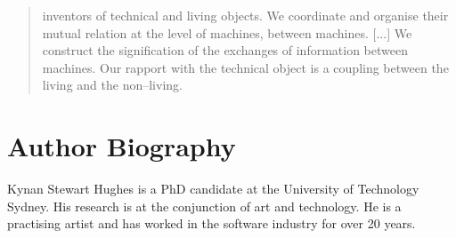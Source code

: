 \documentclass[letter:wpaper]{article}
\begin{document}
    \begin{quote}
        inventors of technical and living objects. We coordinate and organise their mutual relation at the level of machines, between machines. [...] We construct the signification of the exchanges of information between machines. Our rapport with the technical object is a coupling between the living and the non–living. \citep[p.xvi]{SimondonOnThMdOfExstncOfTechnclObjcts1980}
    \end{quote}
    



\section{Author Biography}

Kynan Stewart Hughes is a PhD candidate at the University of Technology Sydney. His research is at the conjunction of art and technology. He is a practising artist and has worked in the software industry for over 20 years. 
\end{document}
